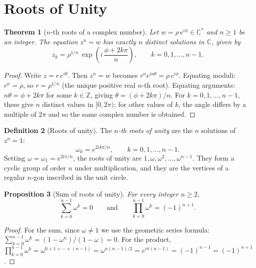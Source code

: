 \documentclass[12pt,a4paper,openany]{book}
\theoremstyle{definition}
\newtheorem{definition}{Definition}[chapter]
\theoremstyle{plain}
\newtheorem{theorem}[definition]{Theorem}
\newtheorem{proposition}[definition]{Proposition}
\theoremstyle{remark}
\newcommand{\C}{\mathbb{C}}
\newcommand{\Z}{\mathbb{Z}}
\begin{document}
\section{Roots of Unity}
\label{sec:roots-unity}

\begin{theorem}[$n$-th roots of a complex number]
\label{thm:nth-roots}
Let $w = \rho\,e^{i\phi}\in\C^*$ and $n\geq 1$ be an integer. The equation $z^n = w$ has exactly $n$ distinct solutions in $\C$, given by
\[
  z_k = \rho^{1/n}\, \exp\!\left(i\,\frac{\phi + 2k\pi}{n}\right), \qquad k = 0, 1, \ldots, n-1.
\]
\end{theorem}

\begin{proof}
Write $z = r\,e^{i\theta}$. Then $z^n = w$ becomes $r^n e^{in\theta} = \rho\, e^{i\phi}$. Equating moduli: $r^n = \rho$, so $r = \rho^{1/n}$ (the unique positive real $n$-th root). Equating arguments: $n\theta = \phi + 2k\pi$ for some $k\in\Z$, giving $\theta = (\phi+2k\pi)/n$. For $k = 0,1,\ldots,n-1$, these give $n$ distinct values in $[0,2\pi)$; for other values of $k$, the angle differs by a multiple of $2\pi$ and so the same complex number is obtained.
\end{proof}

\begin{definition}[Roots of unity]
\label{def:roots-unity}
The \emph{$n$-th roots of unity} are the $n$ solutions of $z^n = 1$:
\[
  \omega_k = e^{2ik\pi/n}, \qquad k = 0, 1, \ldots, n-1.
\]
Setting $\omega = \omega_1 = e^{2i\pi/n}$, the roots of unity are $1, \omega, \omega^2, \ldots, \omega^{n-1}$. They form a cyclic group of order $n$ under multiplication, and they are the vertices of a regular $n$-gon inscribed in the unit circle.
\end{definition}

\begin{proposition}[Sum of roots of unity]
\label{prop:sum-roots}
For every integer $n\geq 2$,
\[
  \sum_{k=0}^{n-1}\omega^k = 0 \qquad\text{and}\qquad \prod_{k=0}^{n-1}\omega^k = (-1)^{n+1}.
\]
\end{proposition}

\begin{proof}
For the sum, since $\omega\neq 1$ we use the geometric series formula: $\sum_{k=0}^{n-1}\omega^k = (1-\omega^n)/(1-\omega) = 0$. For the product, $\prod_{k=0}^{n-1}\omega^k = \omega^{0+1+\cdots+(n-1)} = \omega^{n(n-1)/2} = e^{i\pi(n-1)} = (-1)^{n-1} = (-1)^{n+1}$.
\end{proof}
\end{document}
